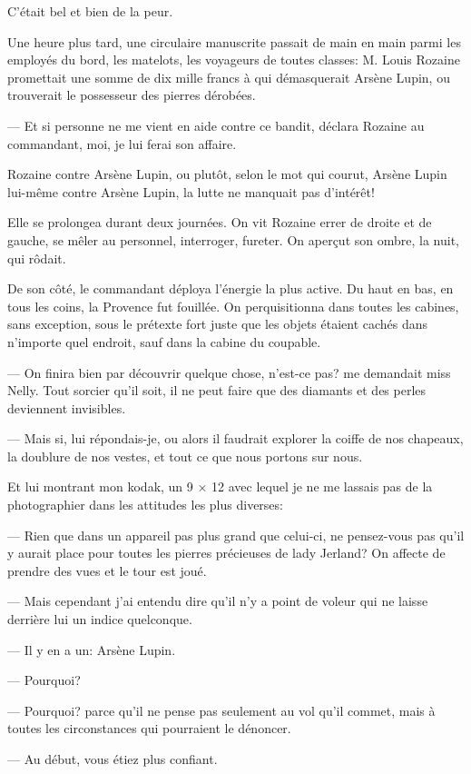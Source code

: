 \documentclass[12pt,a4paper]{book}
\begin{document}
C’était bel et bien de la peur.

Une heure plus tard, une circulaire manuscrite passait de main en main parmi les employés du bord, les matelots, les voyageurs de toutes classes: M. Louis Rozaine promettait une somme de dix mille francs à qui démasquerait Arsène Lupin, ou trouverait le possesseur des pierres dérobées.

— Et si personne ne me vient en aide contre ce bandit, déclara Rozaine au commandant, moi, je lui ferai son affaire. 

Rozaine contre Arsène Lupin, ou plutôt, selon le mot qui courut, Arsène Lupin lui-même contre Arsène Lupin, la lutte ne manquait pas d’intérêt!

Elle se prolongea durant deux journées. On vit Rozaine errer de droite et de gauche, se mêler au personnel, interroger, fureter. On aperçut son ombre, la nuit, qui rôdait.

De son côté, le commandant déploya l’énergie la plus active. Du haut en bas, en tous les coins, la Provence fut fouillée. On perquisitionna dans toutes les cabines, sans exception, sous le prétexte fort juste que les objets étaient cachés dans n’importe quel endroit, sauf dans la cabine du coupable.

— On finira bien par découvrir quelque chose, n’est-ce pas? me demandait miss Nelly. Tout sorcier qu’il soit, il ne peut faire que des diamants et des perles deviennent invisibles.

— Mais si, lui répondais-je, ou alors il faudrait explorer la coiffe de nos chapeaux, la doublure de nos vestes, et tout ce que nous portons sur nous.

Et lui montrant mon kodak, un 9 × 12 avec lequel je ne me lassais pas de la photographier dans les attitudes les plus diverses:

— Rien que dans un appareil pas plus grand que celui-ci, ne pensez-vous pas qu’il y aurait place pour toutes les pierres précieuses de lady Jerland? On affecte de prendre des vues et le tour est joué.

— Mais cependant j’ai entendu dire qu’il n’y a point de voleur qui ne laisse derrière lui un indice quelconque.

— Il y en a un: Arsène Lupin.

— Pourquoi?

— Pourquoi? parce qu’il ne pense pas seulement au vol qu’il commet, mais à toutes les circonstances qui pourraient le dénoncer.

— Au début, vous étiez plus confiant.
\end{document}

